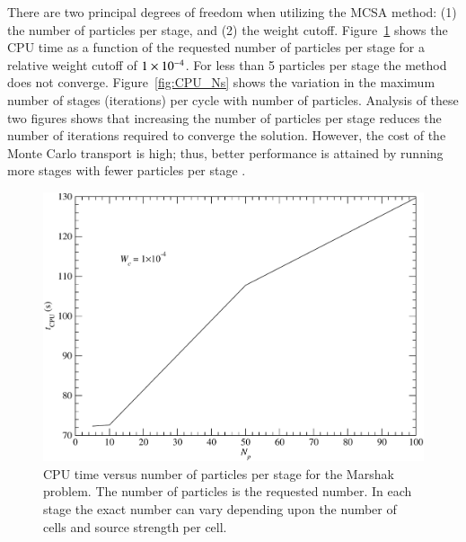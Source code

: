 \documentclass[preprint,12pt]{elsarticle}
\begin{document}
There are two principal degrees of freedom when utilizing the MCSA method: (1)
the number of particles per stage, and (2) the weight cutoff.
Figure~\ref{fig:CPU_Np} shows the CPU time as a function of the requested
number of particles per stage for a relative weight cutoff of $1\times 10^{-4}$.
For less than 5 particles per stage the method does not converge.
Figure~\ref{fig:CPU_Ns} shows the variation in the maximum number of stages
(iterations) per cycle with number of particles.  Analysis of these two
figures shows that increasing the number of particles per stage reduces the
number of iterations required to converge the solution.  However, the cost of
the Monte Carlo transport is high; thus, better performance is attained by
running more stages with fewer particles per stage \cite{evans_2003}.
\begin{figure}[h!]
  \centerline{ \includegraphics[width=5in,clip]{mrshk_np_CPU.pdf}}
  \caption{CPU time versus number of particles per stage for the
    Marshak problem.  The number of particles is the requested number.
    In each stage the exact number can vary depending upon the number
    of cells and source strength per cell.}
  \label{fig:CPU_Np}
\end{figure}
\end{document}
